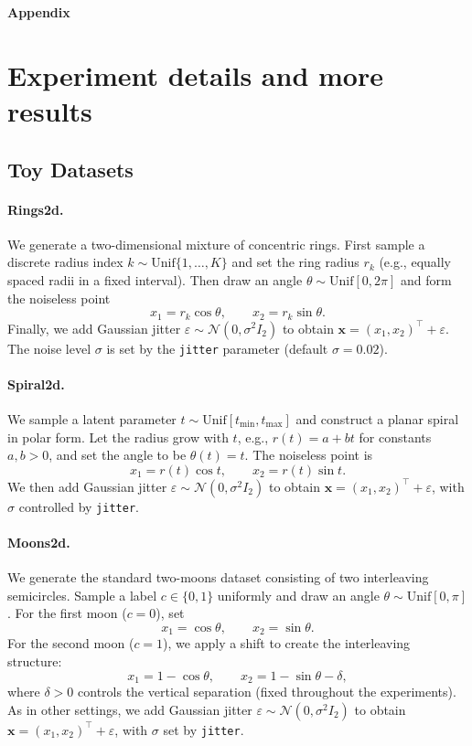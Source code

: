 \documentclass[12pt]{article}
\theoremstyle{definition} %
\newcommand{\Unif}{\mathrm{Unif}}
\begin{document}
\begin{center}
    \huge\bfseries Appendix
\end{center}

\appendix
\section{Experiment details and more results}
\label{appendix_E}

\subsection{Toy Datasets}

\paragraph{Rings2d.}
We generate a two-dimensional mixture of concentric rings. First sample a discrete radius index
$k \sim \Unif\{1,\dots,K\}$ and set the ring radius $r_k$ (e.g., equally spaced radii in a fixed interval).
Then draw an angle $\theta \sim \Unif[0,2\pi]$ and form the noiseless point
\[
x_1 = r_k \cos\theta,\qquad x_2 = r_k \sin\theta.
\]
Finally, we add Gaussian jitter $\varepsilon \sim \mathcal{N}(0,\sigma^2 I_2)$ to obtain
$\mathbf{x}=(x_1,x_2)^\top+\varepsilon$. The noise level $\sigma$ is set by the \texttt{jitter} parameter
(default $\sigma=0.02$).

\paragraph{Spiral2d.}
We sample a latent parameter $t \sim \Unif[t_{\min},t_{\max}]$ and construct a planar spiral in polar form.
Let the radius grow with $t$, e.g., $r(t)=a+bt$ for constants $a,b>0$, and set the angle to be $\theta(t)=t$.
The noiseless point is
\[
x_1 = r(t)\cos t,\qquad x_2 = r(t)\sin t.
\]
We then add Gaussian jitter $\varepsilon \sim \mathcal{N}(0,\sigma^2 I_2)$ to obtain
$\mathbf{x}=(x_1,x_2)^\top+\varepsilon$, with $\sigma$ controlled by \texttt{jitter}.

\paragraph{Moons2d.}
We generate the standard two-moons dataset consisting of two interleaving semicircles.
Sample a label $c\in\{0,1\}$ uniformly and draw an angle $\theta\sim\Unif[0,\pi]$.
For the first moon ($c=0$), set
\[
x_1 = \cos\theta,\qquad x_2 = \sin\theta.
\]
For the second moon ($c=1$), we apply a shift to create the interleaving structure:
\[
x_1 = 1-\cos\theta,\qquad x_2 = 1-\sin\theta - \delta,
\]
where $\delta>0$ controls the vertical separation (fixed throughout the experiments).
As in other settings, we add Gaussian jitter $\varepsilon \sim \mathcal{N}(0,\sigma^2 I_2)$ to obtain
$\mathbf{x}=(x_1,x_2)^\top+\varepsilon$, with $\sigma$ set by \texttt{jitter}.
\end{document}
